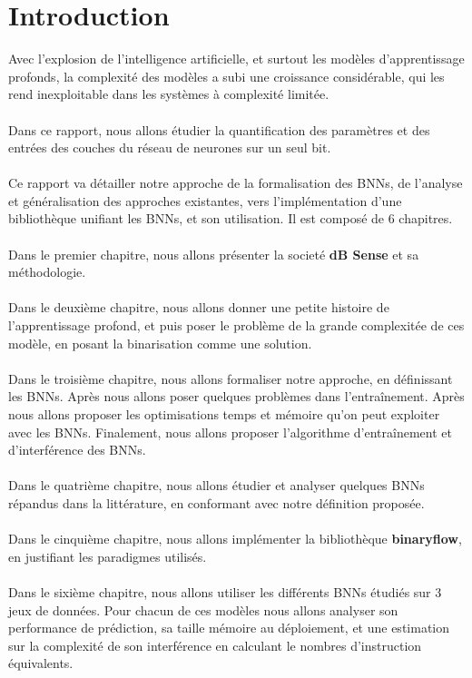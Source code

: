\chapter*{Introduction}


Avec l'explosion de l'intelligence artificielle, et surtout les modèles d'apprentissage profonds, la complexité des modèles a subi une croissance considérable, qui les rend inexploitable dans les systèmes à complexité limitée.
\\
\\
Dans ce rapport, nous allons étudier la quantification des paramètres et des entrées des couches du réseau de neurones sur un seul bit.
\\
\\
Ce rapport va détailler notre approche de la formalisation des BNNs, de l'analyse et généralisation des approches existantes, vers l'implémentation d'une bibliothèque unifiant les BNNs, et son utilisation. Il est composé de $6$ chapitres.
\\
\\
Dans le premier chapitre, nous allons présenter la societé \textbf{dB Sense} et sa méthodologie.
\\
\\
Dans le deuxième chapitre, nous allons donner une petite histoire de l'apprentissage profond, et puis poser le problème de la grande complexitée de ces modèle, en posant la binarisation comme une solution.
\\
\\
Dans le troisième chapitre, nous allons formaliser notre approche, en définissant les BNNs. Après nous allons poser quelques problèmes dans l'entraînement. Après nous allons proposer les optimisations temps et mémoire qu'on peut exploiter avec les BNNs.
\newline Finalement, nous allons proposer l'algorithme d'entraînement et d'interférence des BNNs. 
\\
\\
Dans le quatrième chapitre, nous allons étudier et analyser quelques BNNs répandus dans la littérature, en conformant avec notre définition proposée.
\\
\\
Dans le cinquième chapitre, nous allons implémenter la bibliothèque \textbf{binaryflow}, en justifiant les paradigmes utilisés.
\\
\\
Dans le sixième chapitre, nous allons utiliser les différents BNNs étudiés sur $3$ jeux de données. 
\newline Pour chacun de ces modèles nous allons analyser son performance de prédiction, sa taille mémoire au déploiement, et une estimation sur la complexité de son interférence en calculant le nombres d'instruction équivalents.
